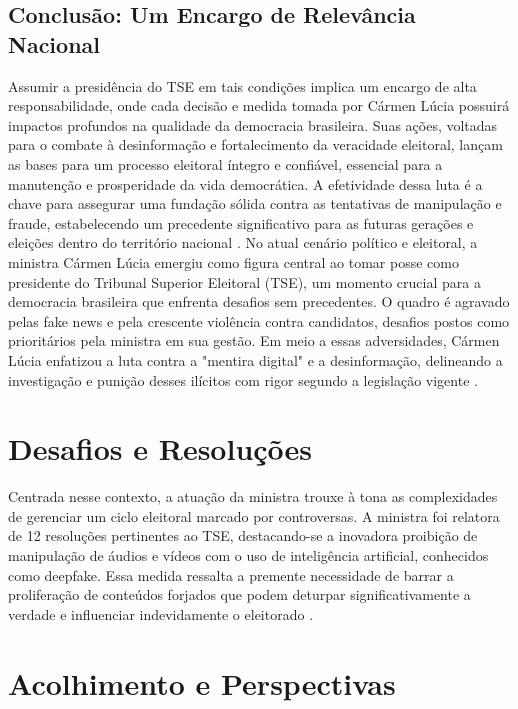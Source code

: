 \documentclass[
   article,       
   12pt,          
   oneside,       
   a4paper,       
   english,       
   brazil,        
   sumario=tradicional
   ]{abntex2}
\begin{document}
\subsection{Conclusão: Um Encargo de Relevância Nacional}
Assumir a presidência do TSE em tais condições implica um encargo de alta responsabilidade, onde cada decisão e medida tomada por Cármen Lúcia possuirá impactos profundos na qualidade da democracia brasileira. Suas ações, voltadas para o combate à desinformação e fortalecimento da veracidade eleitoral, lançam as bases para um processo eleitoral íntegro e confiável, essencial para a manutenção e prosperidade da vida democrática. A efetividade dessa luta é a chave para assegurar uma fundação sólida contra as tentativas de manipulação e fraude, estabelecendo um precedente significativo para as futuras gerações e eleições dentro do território nacional \cite{Quem_centraliza_poderes_em_uma_pessoa_chamase}.
No atual cenário político e eleitoral, a ministra Cármen Lúcia emergiu como figura central ao tomar posse como presidente do Tribunal Superior Eleitoral (TSE), um momento crucial para a democracia brasileira que enfrenta desafios sem precedentes. O quadro é agravado pelas fake news e pela crescente violência contra candidatos, desafios postos como prioritários pela ministra em sua gestão. Em meio a essas adversidades, Cármen Lúcia enfatizou a luta contra a "mentira digital" e a desinformação, delineando a investigação e punição desses ilícitos com rigor segundo a legislação vigente \cite{Carmen_Lucia_toma_posse_na_presidencia_do_TSE}.

\section{Desafios e Resoluções}

Centrada nesse contexto, a atuação da ministra trouxe à tona as complexidades de gerenciar um ciclo eleitoral marcado por controversas. A ministra foi relatora de 12 resoluções pertinentes ao TSE, destacando-se a inovadora proibição de manipulação de áudios e vídeos com o uso de inteligência artificial, conhecidos como deepfake. Essa medida ressalta a premente necessidade de barrar a proliferação de conteúdos forjados que podem deturpar significativamente a verdade e influenciar indevidamente o eleitorado \cite{Contra_o_virus_da_mentira_ha_o_remedio_da_inf}.

\section{Acolhimento e Perspectivas}
\end{document}
